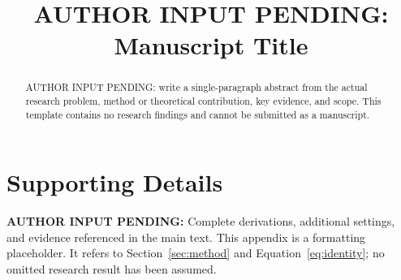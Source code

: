 \documentclass[final,12pt]{colt2026}
\title[Manuscript Title]{AUTHOR INPUT PENDING: Manuscript Title}
\newcommand{\AuthorPending}[1]{\textbf{AUTHOR INPUT PENDING:} #1}
\begin{document}
\maketitle
\begin{abstract}
AUTHOR INPUT PENDING: write a single-paragraph abstract from the actual research problem,
method or theoretical contribution, key evidence, and scope. This template contains
no research findings and cannot be submitted as a manuscript.
\end{abstract}


\appendix
\section{Supporting Details}
\label{app:supporting}
\AuthorPending{Complete derivations, additional settings, and evidence referenced in the main text.}
This appendix is a formatting placeholder. It refers to Section~\ref{sec:method} and
Equation~\ref{eq:identity}; no omitted research result has been assumed.
\end{document}

